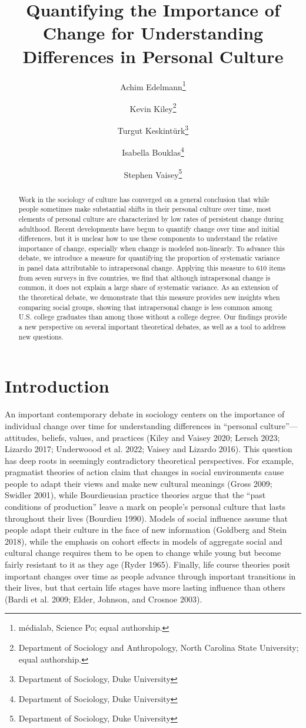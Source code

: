 \documentclass[
  11pt,
]{article}
\title{Quantifying the Importance of Change for Understanding\\
Differences in Personal Culture}
\author{Achim Edelmann\footnote{médialab, Science Po; equal authorship.} \and Kevin
Kiley\footnote{Department of Sociology and Anthropology, North Carolina
  State University; equal authorship.} \and Turgut
Keskintürk\footnote{Department of Sociology, Duke University} \and Isabella
Bouklas\footnote{Department of Sociology, Duke University} \and Stephen
Vaisey\footnote{Department of Sociology, Duke University}}
\date{}
\begin{document}
\maketitle
\begin{abstract}
Work in the sociology of culture has converged on a general conclusion
that while people sometimes make substantial shifts in their personal
culture over time, most elements of personal culture are characterized
by low rates of persistent change during adulthood. Recent developments
have begun to quantify change over time and initial differences, but it
is unclear how to use these components to understand the relative
importance of change, especially when change is modeled non-linearly. To
advance this debate, we introduce a measure for quantifying the
proportion of systematic variance in panel data attributable to
intrapersonal change. Applying this measure to 610 items from seven
surveys in five countries, we find that although intrapersonal change is
common, it does not explain a large share of systematic variance. As an
extension of the theoretical debate, we demonstrate that this measure
provides new insights when comparing social groups, showing that
intrapersonal change is less common among U.S. college graduates than
among those without a college degree. Our findings provide a new
perspective on several important theoretical debates, as well as a tool
to address new questions.
\end{abstract}

\section{Introduction}\label{introduction}

An important contemporary debate in sociology centers on the importance
of individual change over time for understanding differences in
``personal culture''---attitudes, beliefs, values, and practices (Kiley
and Vaisey 2020; Lersch 2023; Lizardo 2017; Underwoood et al. 2022;
Vaisey and Lizardo 2016). This question has deep roots in seemingly
contradictory theoretical perspectives. For example, pragmatist theories
of action claim that changes in social environments cause people to
adapt their views and make new cultural meanings (Gross 2009; Swidler
2001), while Bourdieusian practice theories argue that the ``past
conditions of production'' leave a mark on people's personal culture
that lasts throughout their lives (Bourdieu 1990). Models of social
influence assume that people adapt their culture in the face of new
information (Goldberg and Stein 2018), while the emphasis on cohort
effects in models of aggregate social and cultural change requires them
to be open to change while young but become fairly resistant to it as
they age (Ryder 1965). Finally, life course theories posit important
changes over time as people advance through important transitions in
their lives, but that certain life stages have more lasting influence
than others (Bardi et al. 2009; Elder, Johnson, and Crosnoe 2003).
\end{document}
